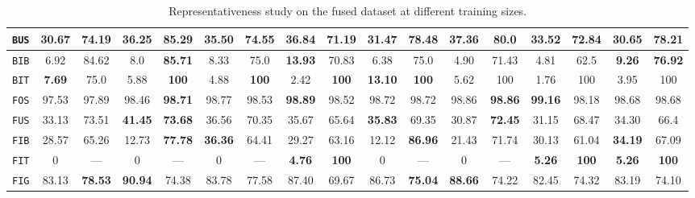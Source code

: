 \begin{sidewaystable}
\begin{center}
\begin{tabular}{|c | c c | c c | c c | c c || c c | c c | c c | c c |}
                    \hline
                    \texttt{BUS} & 30.67 & 74.19 & 36.25 & \textbf{85.29} & 35.50 & 74.55 & \textbf{36.84} & 71.19 & 31.47 & 78.48 & \textbf{37.36} & \textbf{80.0} & 33.52 & 72.84 & 30.65 & 78.21 \\
                    \hline
                    \texttt{BIB} & 6.92 & 84.62 & 8.0 & \textbf{85.71} & 8.33 & 75.0 & \textbf{13.93} & 70.83 & 6.38 & 75.0 & 4.90 & 71.43 & 4.81 & 62.5 & \textbf{9.26} & \textbf{76.92} \\
                    \hline
                    \texttt{BIT} & \textbf{7.69} & 75.0 & 5.88 & \textbf{100} & 4.88 & \textbf{100} & 2.42 & \textbf{100} & \textbf{13.10} & \textbf{100} & 5.62 & 100 & 1.76 & 100 & 3.95 & 100 \\
                    \hline
                    \texttt{FOS} & 97.53 & 97.89 & 98.46 & \textbf{98.71} & 98.77 & 98.53 & \textbf{98.89} & 98.52 & 98.72 & 98.72 & 98.86 & \textbf{98.86} & \textbf{99.16} & 98.18 & 98.68 & 98.68 \\
                    \hline
                    \texttt{FUS} & 33.13 & 73.51 & \textbf{41.45} & \textbf{73.68} & 36.56 & 70.35 & 35.67 & 65.64 & \textbf{35.83} & 69.35 & 30.87 & \textbf{72.45} & 31.15 & 68.47 & 34.30 & 66.4 \\
                    \hline
                    \texttt{FIB} & 28.57 & 65.26 & 12.73 & \textbf{77.78} & \textbf{36.36} & 64.41 & 29.27 & 63.16 & 12.12 & \textbf{86.96} & 21.43 & 71.74 & 30.13 & 61.04 & \textbf{34.19} & 67.09 \\
                    \hline
                    \texttt{FIT} & 0 & --- & 0 & --- & 0 & --- & \textbf{4.76} & \textbf{100} & 0 & --- & 0 & --- & \textbf{5.26} & \textbf{100} & \textbf{5.26} & \textbf{100} \\
                    \hline
                    \texttt{FIG} & 83.13 & \textbf{78.53} & \textbf{90.94} & 74.38 & 83.78 & 77.58 & 87.40 & 69.67 & 86.73 & \textbf{75.04} & \textbf{88.66} & 74.22 & 82.45 & 74.32 & 83.19 & 74.10 \\
                    \hline
                \end{tabular}
                \caption{\label{tab::representativeness_f3} Representativeness study on the fused dataset at different training sizes.}
            \end{center}
        \end{sidewaystable}

